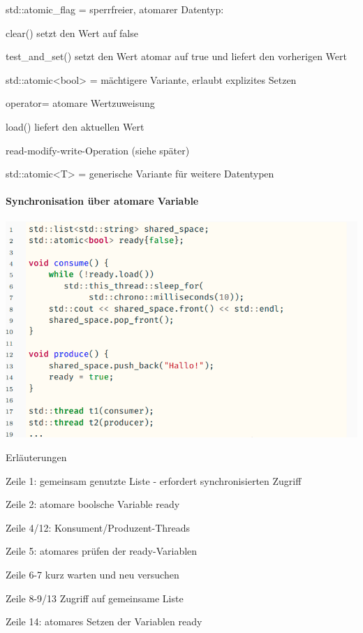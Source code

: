 \documentclass[10pt]{article}
\begin{document}
\begin{itemize*}
  \item std::atomic\_flag = sperrfreier, atomarer Datentyp:
  \begin{itemize*}
    \item clear() setzt den Wert auf false
    \item test\_and\_set() setzt den Wert atomar auf true und liefert den vorherigen Wert
  \end{itemize*}
  \item std::atomic<bool> = mächtigere Variante, erlaubt explizites Setzen
  \begin{itemize*}
    \item operator= atomare Wertzuweisung
    \item load() liefert den aktuellen Wert
    \item read-modify-write-Operation (siehe später)
  \end{itemize*}
  \item std::atomic<T> = generische Variante für weitere Datentypen
\end{itemize*}


\paragraph{Synchronisation über atomare Variable}

\begin{center}
  \includegraphics[width=0.4\linewidth]{Assets/Programmierparadigmen-code-snippet-24}
\end{center}
Erläuterungen
\begin{itemize*}
  \item Zeile 1: gemeinsam genutzte Liste - erfordert synchronisierten Zugriff
  \item Zeile 2: atomare boolsche Variable ready
  \item Zeile 4/12: Konsument/Produzent-Threads
  \item Zeile 5: atomares prüfen der ready-Variablen
  \item Zeile 6-7 kurz warten und neu versuchen
  \item Zeile 8-9/13 Zugriff auf gemeinsame Liste
  \item Zeile 14: atomares Setzen der Variablen ready
\end{itemize*}
\end{document}
